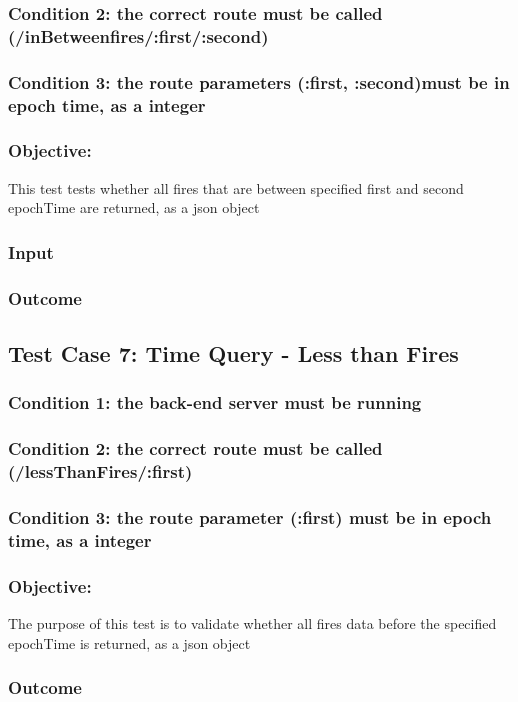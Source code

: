 \subsubsection{Condition 2: the correct route must be called (/inBetweenfires/:first/:second)}
\subsubsection{Condition 3: the route parameters (:first, :second)must be in epoch time, as a integer}
\subsubsection{Objective: } This test tests whether all fires that are between specified first and second epochTime are returned, as a json object
\subsubsection{Input}
\subsubsection{Outcome}


\subsection{Test Case 7: Time Query - Less than Fires}
\subsubsection{Condition 1: the back-end server must be running}
\subsubsection{Condition 2: the correct route must be called (/lessThanFires/:first)}
\subsubsection{Condition 3: the route parameter (:first) must be in epoch time, as a integer}
\subsubsection{Objective:} The purpose of this test is to validate whether all  fires data before the specified epochTime is returned, as a json object
\subsubsection{Outcome}


